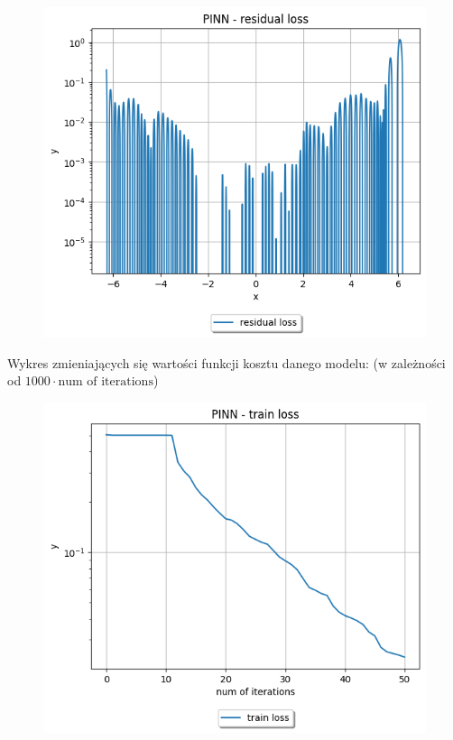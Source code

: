\documentclass{article}
\begin{document}
\begin{figure}[H]
  \includegraphics[width=\linewidth]{figures/3_residual.png}
\end{figure}

Wykres zmieniających się wartości funkcji kosztu danego modelu:
(w zależności od $1000 \cdot \text{num of iterations}$)\\

\begin{figure}[H]
  \includegraphics[width=\linewidth]{figures/3_train.png}
\end{figure}
\end{document}

